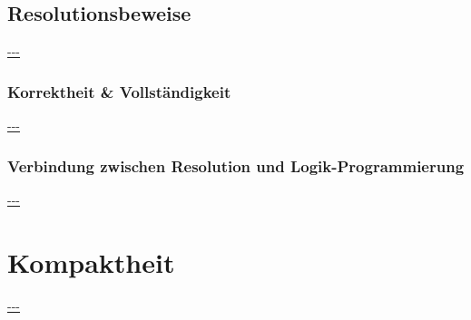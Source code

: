 \documentclass[twocolumn]{article}
\begin{document}
    \subsection{Resolutionsbeweise}
    \url{---}\\

    \subsubsection{Korrektheit \& Vollständigkeit}
    \url{---}\\

    \subsubsection{Verbindung zwischen Resolution und Logik-Programmierung}
    \url{---}\\

    \section{Kompaktheit}
    \url{---}\\
\end{document}
